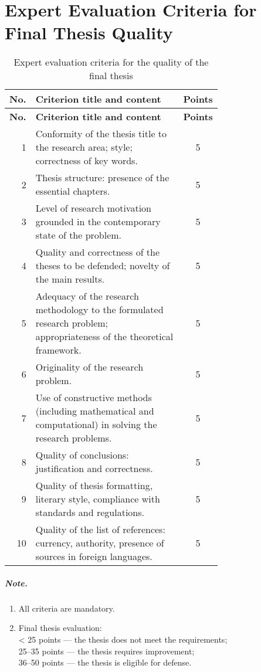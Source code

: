 \chapter{Expert Evaluation Criteria for Final Thesis Quality}
\label{chap:appendixB}

\begin{longtable}{@{}r p{0.72\linewidth} c@{}}
\caption{Expert evaluation criteria for the quality of the final thesis}\label{tab:expert-criteria}\\
\toprule
\textbf{No.} & \textbf{Criterion title and content} & \textbf{Points}\\
\midrule
\endfirsthead

\toprule
\textbf{No.} & \textbf{Criterion title and content} & \textbf{Points}\\
\midrule
\endhead

\bottomrule
\endfoot

1 & Conformity of the thesis title to the research area; style; correctness of key words. & 5\\
2 & Thesis structure: presence of the essential chapters. & 5\\
3 & Level of research motivation grounded in the contemporary state of the problem. & 5\\
4 & Quality and correctness of the theses to be defended; novelty of the main results. & 5\\
5 & Adequacy of the research methodology to the formulated research problem; appropriateness of the theoretical framework. & 5\\
6 & Originality of the research problem. & 5\\
7 & Use of constructive methods (including mathematical and computational) in solving the research problems. & 5\\
8 & Quality of conclusions: justification and correctness. & 5\\
9 & Quality of thesis formatting, literary style, compliance with standards and regulations. & 5\\
10 & Quality of the list of references: currency, authority, presence of sources in foreign languages. & 5\\

\end{longtable}


\paragraph{Note.}

\begin{enumerate}
  \item All criteria are mandatory.
  \item Final thesis evaluation: \\
    \textless{} 25 points — the thesis does not meet the requirements; \\
    25--35 points — the thesis requires improvement; \\
    36--50 points — the thesis is eligible for defense.
\end{enumerate}